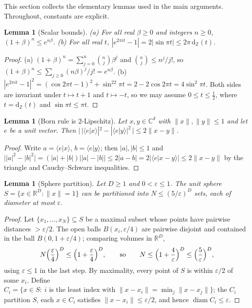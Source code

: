 \documentclass[11pt]{amsart}
\newtheorem{lemma}[theorem]{Lemma}
\theoremstyle{definition}
\theoremstyle{remark}
\newcommand{\R}{\mathbb{R}}
\newcommand{\C}{\mathbb{C}}
\newcommand{\Z}{\mathbb{Z}}
\newcommand{\dz}[1]{\mathrm{d}_{\Z}(#1)}
\begin{document}
This section collects the elementary lemmas used in the main
arguments. Throughout, constants are explicit.

\begin{lemma}[Scalar bounds]\label{lem:scalar}
\emph{(a)} For all real $\beta\ge0$ and integers $n\ge0$,
$(1+\beta)^n\le e^{n\beta}$.
\emph{(b)} For all real $t$,
$|e^{2\pi it}-1|=2|\sin\pi t|\le2\pi\,\dz{t}$.
\end{lemma}

\begin{proof}
(a) $(1+\beta)^n=\sum_{j=0}^n\binom nj\beta^j$ and
$\binom nj\le n^j/j!$, so $(1+\beta)^n\le\sum_{j\ge0}(n\beta)^j/j!
=e^{n\beta}$.
(b) $|e^{2\pi it}-1|^2=(\cos2\pi t-1)^2+\sin^22\pi t
=2-2\cos2\pi t=4\sin^2\pi t$. Both sides are invariant under
$t\mapsto t+1$ and $t\mapsto-t$, so we may assume
$0\le t\le\tfrac12$, where $t=\dz t$ and $\sin\pi t\le\pi t$.
\end{proof}

\begin{lemma}[Born rule is $2$-Lipschitz]\label{lem:born}
Let $x,y\in\C^d$ with $\|x\|,\|y\|\le1$ and let $e$ be a unit
vector. Then
$\bigl|\,|\langle e|x\rangle|^2-|\langle e|y\rangle|^2\,\bigr|
\le2\|x-y\|$.
\end{lemma}

\begin{proof}
Write $a=\langle e|x\rangle$, $b=\langle e|y\rangle$; then
$|a|,|b|\le1$ and
$\bigl||a|^2-|b|^2\bigr|=(|a|+|b|)\bigl||a|-|b|\bigr|
\le2|a-b|=2|\langle e|x-y\rangle|\le2\|x-y\|$
by the triangle and Cauchy--Schwarz inequalities.
\end{proof}

\begin{lemma}[Sphere partition]\label{lem:partition}
Let $D\ge1$ and $0<\varepsilon\le1$. The unit sphere
$S=\{x\in\R^D:\|x\|=1\}$ can be partitioned into
$N\le(5/\varepsilon)^D$ sets, each of diameter at most $\varepsilon$.
\end{lemma}

\begin{proof}
Let $\{x_1,\dots,x_N\}\subseteq S$ be a maximal subset whose points
have pairwise distances $>\varepsilon/2$. The open balls
$B(x_i,\varepsilon/4)$ are pairwise disjoint and contained in the ball
$B(0,1+\varepsilon/4)$; comparing volumes in $\R^D$,
\[
  N\Bigl(\frac\varepsilon4\Bigr)^D\le\Bigl(1+\frac\varepsilon4\Bigr)^D,
  \qquad\text{so}\qquad
  N\le\Bigl(1+\frac4\varepsilon\Bigr)^D\le\Bigl(\frac5\varepsilon\Bigr)^D,
\]
using $\varepsilon\le1$ in the last step. By maximality, every point
of $S$ is within $\varepsilon/2$ of some $x_i$. Define
$C_i=\{x\in S:\ i\text{ is the least index with }
\|x-x_i\|=\min_j\|x-x_j\|\}$; the $C_i$ partition $S$, each
$x\in C_i$ satisfies $\|x-x_i\|\le\varepsilon/2$, and hence
$\operatorname{diam}C_i\le\varepsilon$.
\end{proof}
\end{document}
